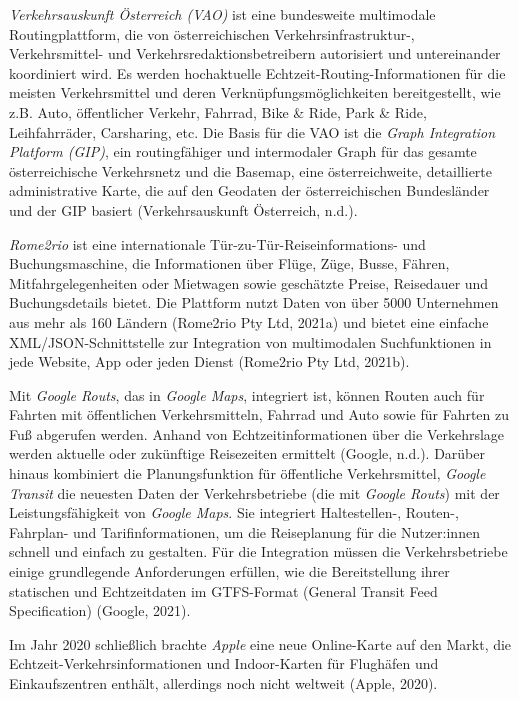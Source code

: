 \documentclass[
]{book}
\begin{document}
\emph{Verkehrsauskunft Österreich (VAO)} ist eine bundesweite multimodale Routingplattform, die von österreichischen Verkehrsinfrastruktur-, Verkehrsmittel- und Verkehrsredaktionsbetreibern autorisiert und untereinander koordiniert wird. Es werden hochaktuelle Echtzeit-Routing-Informationen für die meisten Verkehrsmittel und deren Verknüpfungsmöglichkeiten bereitgestellt, wie z.B. Auto, öffentlicher Verkehr, Fahrrad, Bike \& Ride, Park \& Ride, Leihfahrräder, Carsharing, etc. Die Basis für die VAO ist die \emph{Graph Integration Platform (GIP)}, ein routingfähiger und intermodaler Graph für das gesamte österreichische Verkehrsnetz und die Basemap, eine österreichweite, detaillierte administrative Karte, die auf den Geodaten der österreichischen Bundesländer und der GIP basiert (Verkehrsauskunft Österreich, n.d.).

\emph{Rome2rio} ist eine internationale Tür-zu-Tür-Reiseinformations- und Buchungsmaschine, die Informationen über Flüge, Züge, Busse, Fähren, Mitfahrgelegenheiten oder Mietwagen sowie geschätzte Preise, Reisedauer und Buchungsdetails bietet. Die Plattform nutzt Daten von über 5000 Unternehmen aus mehr als 160 Ländern (Rome2rio Pty Ltd, 2021a) und bietet eine einfache XML/JSON-Schnittstelle zur Integration von multimodalen Suchfunktionen in jede Website, App oder jeden Dienst (Rome2rio Pty Ltd, 2021b).

Mit \emph{Google Routs}, das in \emph{Google Maps}, integriert ist, können Routen auch für Fahrten mit öffentlichen Verkehrsmitteln, Fahrrad und Auto sowie für Fahrten zu Fuß abgerufen werden. Anhand von Echtzeitinformationen über die Verkehrslage werden aktuelle oder zukünftige Reisezeiten ermittelt (Google, n.d.). Darüber hinaus kombiniert die Planungsfunktion für öffentliche Verkehrsmittel, \emph{Google Transit} die neuesten Daten der Verkehrsbetriebe (die mit \emph{Google Routs}) mit der Leistungsfähigkeit von \emph{Google Maps}. Sie integriert Haltestellen-, Routen-, Fahrplan- und Tarifinformationen, um die Reiseplanung für die Nutzer:innen schnell und einfach zu gestalten. Für die Integration müssen die Verkehrsbetriebe einige grundlegende Anforderungen erfüllen, wie die Bereitstellung ihrer statischen und Echtzeitdaten im GTFS-Format (General Transit Feed Specification) (Google, 2021).

Im Jahr 2020 schließlich brachte \emph{Apple} eine neue Online-Karte auf den Markt, die Echtzeit-Verkehrsinformationen und Indoor-Karten für Flughäfen und Einkaufszentren enthält, allerdings noch nicht weltweit (Apple, 2020).
\end{document}
